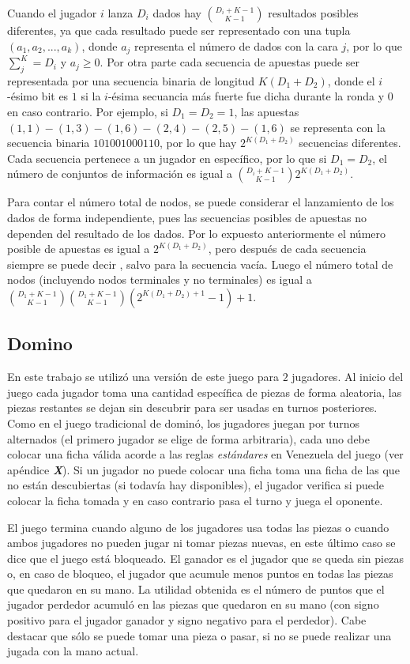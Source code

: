 Cuando el jugador $i$ lanza $D_i$ dados hay $\binom{D_i+K-1}{K-1}$ resultados posibles diferentes, ya que cada resultado puede ser representado con una tupla $(a_1, a_2, ..., a_k)$, donde $a_j$ representa el número de dados con la cara $j$, por lo que $\sum_j^K = D_i$ y $a_j \geq 0$. Por otra parte cada secuencia de apuestas puede ser representada por una secuencia binaria de longitud $K(D_1 + D_2)$, donde el $i$-ésimo bit es $1$ si la $i$-ésima secuancia más fuerte fue dicha durante la ronda y $0$ en caso contrario. Por ejemplo, si $D_1 = D_2 = 1$, las apuestas $(1, 1)-(1, 3)-(1, 6)-(2, 4)-(2, 5)-(1, 6)$ se representa con la secuencia binaria $101001000110$, por lo que hay $2^{K(D_1 + D_2)}$ secuencias diferentes. Cada secuencia pertenece a un jugador en específico, por lo que si $D_1 = D_2$, el número de conjuntos de información  es igual a  $\binom{D_i+K-1}{K-1}2^{K(D_1 + D_2)}$.

Para contar el número total de nodos, se puede considerar el lanzamiento de los dados de forma independiente, pues las secuencias posibles de apuestas no dependen del resultado de los dados. Por lo expuesto anteriormente el número posible de apuestas es igual a $2^{K(D_1+D_2)}$, pero después de cada secuencia siempre se puede decir , salvo para la secuencia vacía. Luego el número total de nodos (incluyendo nodos terminales y no terminales) es igual a $\binom{D_1+K-1}{K-1}\binom{D_1+K-1}{K-1}(2^{K(D_1+D_2)+1}-1)+1$.

\subsection{Domino}
En este trabajo se utilizó una versión de este juego para $2$ jugadores. Al inicio del juego cada jugador toma una cantidad específica de piezas de forma aleatoria, las piezas restantes se dejan sin descubrir para ser usadas en turnos posteriores. Como en el juego tradicional de dominó, los jugadores juegan por turnos alternados (el primero jugador se elige de forma arbitraria), cada uno debe colocar una ficha válida acorde a las reglas \textit{estándares} en Venezuela del juego (ver apéndice \textit{\textbf{X}}). Si un jugador no puede colocar una ficha toma una ficha de las que no están descubiertas (si todavía hay disponibles), el jugador verifica si puede colocar la ficha tomada y en caso contrario pasa el turno y juega el oponente.

El juego termina cuando alguno de los jugadores usa todas las piezas o cuando ambos jugadores no pueden jugar ni tomar piezas nuevas, en este último caso se dice que el juego está bloqueado. El ganador es el jugador que se queda sin piezas o, en caso de bloqueo, el jugador que acumule menos puntos en todas las piezas que quedaron en su mano. La utilidad obtenida es el número de puntos que el jugador perdedor acumuló en las piezas que quedaron en su mano (con signo positivo para el jugador ganador y signo negativo para el perdedor). Cabe destacar que sólo se puede tomar una pieza o pasar, si no se puede realizar una jugada con la mano actual.

